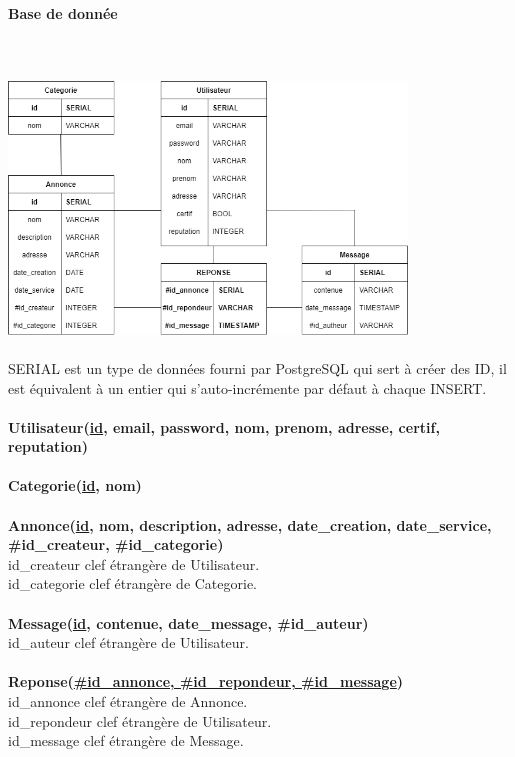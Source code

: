 \documentclass[a4paper,11pt]{article}
\begin{document}
\paragraph{Base de donnée}\leavevmode
\\\\
\includegraphics[width=400px]{images/Schema-relationnel-BDD.png}\\\\
SERIAL est un type de données fourni par PostgreSQL qui sert à créer des ID, il est équivalent à un entier qui s'auto-incrémente par défaut à chaque INSERT.\\\\
\textbf{Utilisateur(\underline{id}, email, password, nom, prenom, adresse, certif, reputation)}\\\\
\textbf{Categorie(\underline{id}, nom)}\\\\
\textbf{Annonce(\underline{id}, nom, description, adresse, date\_creation, date\_service, \#id\_createur, \#id\_categorie)}\\
id\_createur clef étrangère de Utilisateur.\\
id\_categorie clef étrangère de Categorie.\\\\
\textbf{Message(\underline{id}, contenue, date\_message, \#id\_auteur)}\\
id\_auteur clef étrangère de Utilisateur.\\\\
\textbf{Reponse(\underline{\#id\_annonce, \#id\_repondeur, \#id\_message})}\\
id\_annonce clef étrangère de Annonce.\\
id\_repondeur clef étrangère de Utilisateur.\\
id\_message clef étrangère de Message.\\
\end{document}
